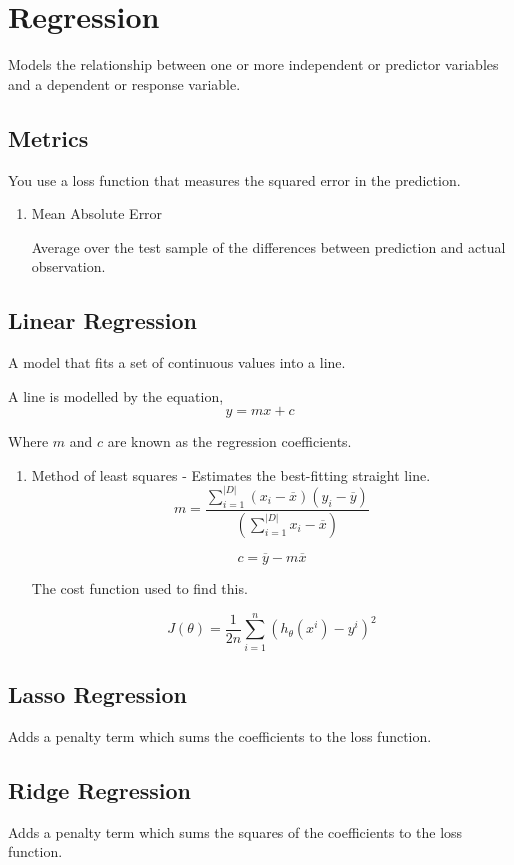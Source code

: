 \documentclass[11pt]{article}
\begin{document}
\section{Regression}
\label{sec:org78653f7}
Models the relationship between one or more independent or predictor variables and a dependent or response variable.
\subsection{Metrics}
\label{sec:org0798510}
You use a loss function that measures the squared error in the prediction.
\begin{enumerate}
\item Mean Absolute Error
\label{sec:org049fee0}

Average over the test sample of the differences between prediction and actual observation.
\end{enumerate}
\subsection{Linear Regression}
\label{sec:org69f0d53}
A model that fits a set of continuous values into a line.

A line is modelled by the equation,
$$y = mx + c$$

Where \(m\) and \(c\) are known as the regression coefficients.
\begin{enumerate}
\item Method of least squares - Estimates the best-fitting straight line.
\label{sec:org2b5f7ef}
$$m = \frac{\sum_{i=1}^{|D|} (x_i - \overline{x})(y_i - \overline{y})}{(\sum_{i=1}^{|D|}x_i - \overline{x})}$$

$$c = \overline{y} - m\overline{x}$$

The cost function used to find this.

$$J(\theta) = \frac{1}{2n}\sum_{i=1}^n(h_{\theta}(x^i) - y^i)^{2}$$
\end{enumerate}
\subsection{Lasso Regression}
\label{sec:orgbf7fb13}
Adds a penalty term which sums the coefficients to the loss function.
\subsection{Ridge Regression}
\label{sec:org2599dce}
Adds a penalty term which sums the squares of the coefficients to the loss function.
\end{document}

